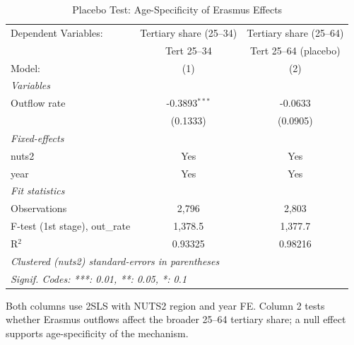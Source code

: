 \begin{table}[htbp]
   \caption{\label{tab:placebo} Placebo Test: Age-Specificity of Erasmus Effects}
   \centering
   \scriptsize
   \begin{tabular}{lcc}
      \tabularnewline \midrule \midrule
      Dependent Variables:           & Tertiary share (25--34) & Tertiary share (25--64)\\  
                                     & Tert 25--34             & Tert 25--64 (placebo) \\   
      Model:                         & (1)                     & (2)\\  
      \midrule
      \emph{Variables}\\
      Outflow rate                   & -0.3893$^{***}$         & -0.0633\\   
                                     & (0.1333)                & (0.0905)\\   
      \midrule
      \emph{Fixed-effects}\\
      nuts2                          & Yes                     & Yes\\  
      year                           & Yes                     & Yes\\  
      \midrule
      \emph{Fit statistics}\\
      Observations                   & 2,796                   & 2,803\\  
      F-test (1st stage), out\_rate  & 1,378.5                 & 1,377.7\\  
      R$^2$                          & 0.93325                 & 0.98216\\  
      \midrule \midrule
      \multicolumn{3}{l}{\emph{Clustered (nuts2) standard-errors in parentheses}}\\
      \multicolumn{3}{l}{\emph{Signif. Codes: ***: 0.01, **: 0.05, *: 0.1}}\\
   \end{tabular}
   
   \par \raggedright 
   Both columns use 2SLS with NUTS2 region and year FE. Column 2 tests whether Erasmus outflows affect the broader 25--64 tertiary share; a null effect supports age-specificity of the mechanism.
\end{table}
